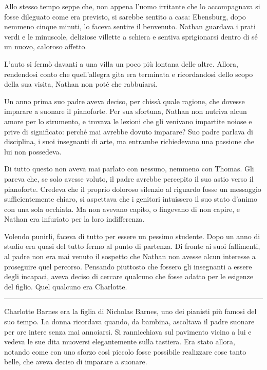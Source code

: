\documentclass[a4paper,oneside,11pt]{memoir}
\begin{document}
Allo stesso tempo seppe che, non appena l'uomo irritante che lo accompagnava si
fosse dileguato come era previsto, si sarebbe sentito a casa: Ebensburg, dopo
nemmeno cinque minuti, lo faceva sentire il benvenuto. Nathan guardava i prati
verdi e le minuscole, deliziose villette a schiera e sentiva sprigionarsi dentro
di sé un nuovo, caloroso affetto.

L'auto si fermò davanti a una villa un poco più lontana delle altre. Allora,
rendendosi conto che quell'allegra gita era terminata e ricordandosi dello scopo
della sua visita, Nathan non poté che rabbuiarsi.

Un anno prima suo padre aveva deciso, per chissà quale ragione, che dovesse
imparare a suonare il pianoforte. Per sua sfortuna, Nathan non nutriva alcun
amore per lo strumento, e trovava le lezioni che gli venivano impartite noiose e
prive di significato: perché mai avrebbe dovuto imparare? Suo padre parlava di
disciplina, i suoi insegnanti di arte, ma entrambe richiedevano una passione che
lui non possedeva.

Di tutto questo non aveva mai parlato con nessuno, nemmeno con Thomas. Gli
pareva che, se solo avesse voluto, il padre avrebbe percepito il suo astio verso
il pianoforte. Credeva che il proprio doloroso silenzio al riguardo fosse un
messaggio sufficientemente chiaro, si aspettava che i genitori intuissero il suo
stato d'animo con una sola occhiata. Ma non avevano capito, o fingevano di non
capire, e Nathan era infuriato per la loro indifferenza.

Volendo punirli, faceva di tutto per essere un pessimo studente. Dopo un anno di
studio era quasi del tutto fermo al punto di partenza. Di fronte ai suoi
fallimenti, al padre non era mai venuto il sospetto che Nathan non avesse alcun
interesse a proseguire quel percorso. Pensando piuttosto che fossero gli
insegnanti a essere degli incapaci, aveva deciso di cercare qualcuno che fosse
adatto per le esigenze del figlio. Quel qualcuno era Charlotte.

\plainbreak{1}

Charlotte Barnes era la figlia di Nicholas Barnes, uno dei pianisti più famosi
del suo tempo. La donna ricordava quando, da bambina, ascoltava il padre suonare
per ore intere senza mai annoiarsi. Si rannicchiava sul pavimento vicino a lui e
vedeva le sue dita muoversi elegantemente sulla tastiera. Era stato allora,
notando come con uno sforzo così piccolo fosse possibile realizzare cose tanto
belle, che aveva deciso di imparare a suonare.
\end{document}
